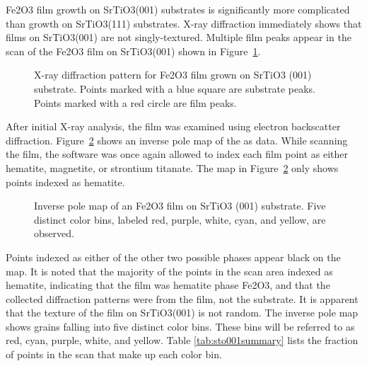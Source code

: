 \documentclass[12pt,%
              twoside,
               letterpaper]{uiothesis}
\begin{document}
Fe2O3 film growth on SrTiO3(001) substrates is significantly more complicated
than growth on SrTiO3(111) substrates. X-ray diffraction immediately shows that films
on SrTiO3(001) are not singly-textured. Multiple film peaks appear in the
\texttheta{} scan of the Fe2O3 film on SrTiO3(001) shown in
Figure~\ref{fig:001xray}. 
\begin{figure}
\centering
	\caption[ pattern for Fe2O3 film on SrTiO3]{%
		X-ray diffraction pattern for Fe2O3 film grown on 
		SrTiO3 (001) substrate. Points marked with a blue 
		square are substrate peaks. Points marked with a red 
		circle are film peaks.}
	\label{fig:001xray}
\end{figure}
After initial X-ray analysis, the film was examined using electron backscatter
diffraction. Figure~\ref{fig:001map} shows an inverse pole map of the as  data. While
scanning the film, the  software was once again allowed to index each film point as
either hematite, magnetite, or strontium titanate. The map in Figure~\ref{fig:001map} only
shows points indexed as hematite. 
\begin{figure}
	\caption[ map of Fe2O3 film on SrTiO3 (001)]{%
		Inverse pole  map of an Fe2O3 film on SrTiO3 (001) 
		substrate. Five distinct color bins, labeled red, purple, white, 
		cyan, and yellow, are observed.}
	\label{fig:001map}
\end{figure}
Points indexed as either of the other two possible phases appear black on the map. It is
noted that the majority of the points in the scan area indexed as hematite, indicating
that the film was hematite phase Fe2O3, and that the collected diffraction patterns
were from the film, not the substrate. It is apparent that the texture of the film on
SrTiO3(001) is not random. The inverse pole map shows grains falling into five
distinct color bins. These bins will be referred to as red, cyan, purple, white, and
yellow. Table \ref{tab:sto001summary} lists the fraction of points in the scan that make
up each color bin. 
\end{document}
